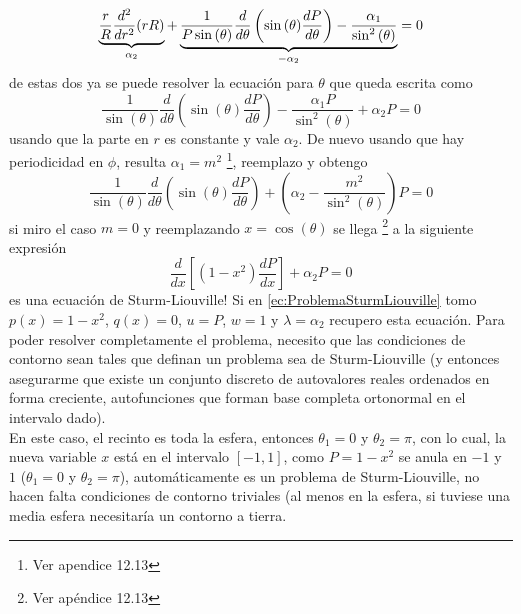 \begin{equation*}
    \underbrace%
    {%
        \frac{r}{R}
        \frac{d^{2}}{dr^{2}}(rR)
    }_{\alpha_{2}}
    +
    \underbrace%
    {%
        \frac{1}{P\sin{(\theta)}}
        \frac{d}{d\theta}
        \left(
            \sin{(\theta)}\frac{dP}{d\theta}
        \right)
        -
        \frac{\alpha_{1}}{\sin^{2}{(\theta)}}
    }_{-\alpha_{2}}
        = 0
\end{equation*}
de estas dos ya se puede resolver la ecuación para $\theta$ que queda escrita como
\begin{equation*}
    \frac{1}{\sin{(\theta)}}\frac{d}{d\theta}
    \left(
        \sin{(\theta)}\frac{dP}{d\theta}
    \right)
    -\frac{\alpha_{1}P}{\sin^{2}{(\theta)}}
    + \alpha_{2}P = 0
\end{equation*}
usando que la parte en $r$ es constante y vale $\alpha_{2}$. De nuevo usando que hay periodicidad en $\phi$, resulta $\alpha_{1} = m^{2}$ \footnote{Ver apendice 12.13}, reemplazo y obtengo
\begin{equation*}
    \frac{1}{\sin{(\theta)}}\frac{d}{d\theta}
    \left(
        \sin{(\theta)}\frac{dP}{d\theta}
    \right)
    +
    \left(
        \alpha_{2} - \frac{m^{2}}{\sin^{2}{(\theta)}}
    \right)P
    = 0 
\end{equation*}
si miro el caso $m = 0$ y reemplazando $x = \cos{(\theta)}$ se llega \footnote{Ver apéndice 12.13} a la siguiente expresión
\begin{equation}
    \frac{d}{dx}
    \left[
        (1-x^{2})\frac{dP}{dx}
    \right]
    + \alpha_{2} P
    = 0
        \label{ec:SeparacionEsfericas3}
\end{equation}
es una ecuación de Sturm-Liouville! Si en \eqref{ec:ProblemaSturmLiouville} tomo $p(x) = 1-x^{2}$, $q(x) = 0$, $u = P$, $w = 1$ y $\lambda = \alpha_{2}$ recupero esta ecuación. Para poder resolver completamente el problema, necesito que las condiciones de contorno sean tales que definan un problema sea de Sturm-Liouville (y entonces asegurarme que existe un conjunto discreto de autovalores reales ordenados en forma creciente, autofunciones que forman base completa ortonormal en el intervalo dado).\\
\indent En este caso, el recinto es toda la esfera, entonces $\theta_{1} = 0$ y $\theta_{2} = \pi$, con lo cual, la nueva variable $x$ está en el intervalo $[-1,1]$, como $P = 1-x^{2}$ se anula en $-1$ y $1$ ($\theta_{1}=0$ y $\theta_{2} = \pi$), automáticamente es un problema de Sturm-Liouville, no hacen falta condiciones de contorno triviales (al menos en la esfera, si tuviese una media esfera necesitaría un contorno a tierra.\\
